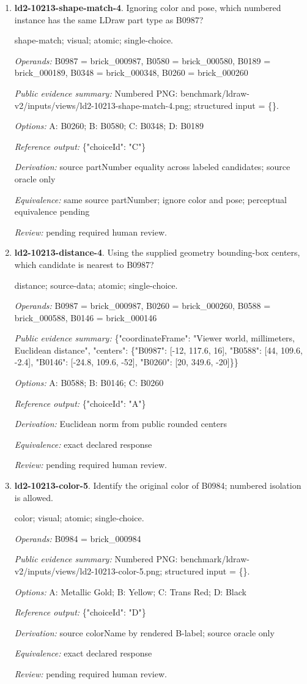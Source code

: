 \begin{enumerate}
\item \textbf{ld2-10213-shape-match-4}. Ignoring color and pose, which numbered instance has the same LDraw part type as B0987?
\par{\small shape-match; visual; atomic; single-choice.\par\textit{Operands:} B0987 = brick\_000987, B0580 = brick\_000580, B0189 = brick\_000189, B0348 = brick\_000348, B0260 = brick\_000260\par\textit{Public evidence summary:} Numbered PNG: benchmark/ldraw-v2/inputs/views/ld2-10213-shape-match-4.png; structured input = \{\}.\par\textit{Options:} A: B0260; B: B0580; C: B0348; D: B0189\par\textit{Reference output:} \{"choiceId": "C"\}\par\textit{Derivation:} source partNumber equality across labeled candidates; source oracle only\par\textit{Equivalence:} same source partNumber; ignore color and pose; perceptual equivalence pending\par\textit{Review:} pending required human review.}
\item \textbf{ld2-10213-distance-4}. Using the supplied geometry bounding-box centers, which candidate is nearest to B0987?
\par{\small distance; source-data; atomic; single-choice.\par\textit{Operands:} B0987 = brick\_000987, B0260 = brick\_000260, B0588 = brick\_000588, B0146 = brick\_000146\par\textit{Public evidence summary:} \{"coordinateFrame": "Viewer world, millimeters, Euclidean distance", "centers": \{"B0987": [-12, 117.6, 16], "B0588": [44, 109.6, -2.4], "B0146": [-24.8, 109.6, -52], "B0260": [20, 349.6, -20]\}\}\par\textit{Options:} A: B0588; B: B0146; C: B0260\par\textit{Reference output:} \{"choiceId": "A"\}\par\textit{Derivation:} Euclidean norm from public rounded centers\par\textit{Equivalence:} exact declared response\par\textit{Review:} pending required human review.}
\item \textbf{ld2-10213-color-5}. Identify the original color of B0984; numbered isolation is allowed.
\par{\small color; visual; atomic; single-choice.\par\textit{Operands:} B0984 = brick\_000984\par\textit{Public evidence summary:} Numbered PNG: benchmark/ldraw-v2/inputs/views/ld2-10213-color-5.png; structured input = \{\}.\par\textit{Options:} A: Metallic Gold; B: Yellow; C: Trans Red; D: Black\par\textit{Reference output:} \{"choiceId": "D"\}\par\textit{Derivation:} source colorName by rendered B-label; source oracle only\par\textit{Equivalence:} exact declared response\par\textit{Review:} pending required human review.}

\end{enumerate}
